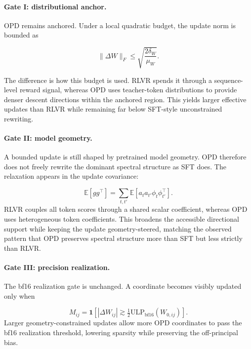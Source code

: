 \documentclass{llmxive}
\begin{document}
\paragraph{Gate I: distributional anchor.}
OPD remains anchored. Under a local quadratic budget, the update norm is
bounded as

\begin{equation}
\|\Delta W\|_F
\leq
\sqrt{\frac{2\delta_W}{\mu_W}} .
\label{eq:opd_gate1_bound}
\end{equation}

The difference is how this budget is used. RLVR spends it through a
sequence-level reward signal, whereas OPD uses teacher-token distributions to provide denser descent directions within the anchored region. This yields larger effective updates than RLVR while remaining far below SFT-style unconstrained rewriting.

\paragraph{Gate II: model geometry.}
A bounded update is still shaped by pretrained model geometry. OPD therefore does not freely rewrite the dominant spectral structure as SFT does. The relaxation appears in the update covariance:

\begin{equation}
\mathbb{E}[gg^\top]
=
\sum_{t,t'}
\mathbb{E}\!\left[
a_t a_{t'} \phi_t \phi_{t'}^\top
\right].
\label{eq:opd_gradient_cov}
\end{equation}
RLVR couples all token scores through a shared scalar coefficient, whereas OPD uses heterogeneous token coefficients. This broadens the accessible directional support while keeping the update geometry-steered, matching the observed pattern that OPD preserves spectral structure more than SFT but less strictly than RLVR.

\paragraph{Gate III: precision realization.}
The bf16 realization gate is unchanged. A coordinate becomes visibly updated only when

\begin{equation}
M_{ij}
=
\mathbf{1}\!\left[
|\Delta W_{ij}|
\gtrsim
\tfrac{1}{2}\mathrm{ULP}_{\mathrm{bf16}}(W_{0,ij})
\right].
\label{eq:bf16_realization_gate}
\end{equation}
Larger geometry-constrained updates allow more OPD coordinates to pass the bf16 realization threshold, lowering sparsity while preserving the
off-principal bias.
\end{document}
